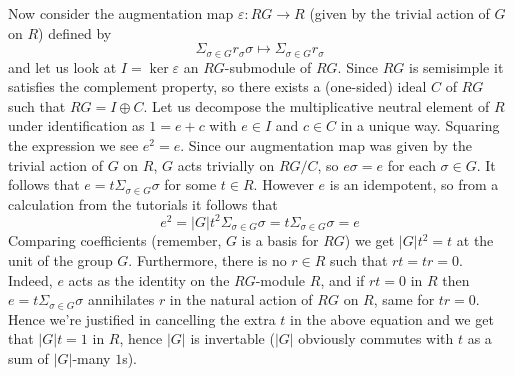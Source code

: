 \documentclass[a4paper, 12pt]{article}
\begin{document}
\begin{itemize}
	Now consider the augmentation map $\varepsilon \colon RG \to R$ (given by the trivial action of $G$ on $R$) defined by
	\[
	\Sigma_{\sigma \in G} r_\sigma \sigma \mapsto \Sigma_{\sigma \in G} r_\sigma
	\]
	and let us look at $I = \ker\varepsilon$ an $RG$-submodule of $RG$. Since $RG$ is semisimple it satisfies the complement property, so there exists a (one-sided) ideal $C$ of $RG$ such that $RG = I \oplus C$. Let us decompose the multiplicative neutral element of $R$ under identification as $1 = e + c$ with $e \in I$ and $c \in C$ in a unique way. Squaring the expression we see $e^2 = e$. Since our augmentation map was given by the trivial action of $G$ on $R$, $G$ acts trivially on $RG/C$, so $e\sigma = e$ for each $\sigma \in G$. It follows that $e = t\Sigma_{\sigma \in G}\sigma$ for some $t \in R$. However $e$ is an idempotent, so from a calculation from the tutorials it follows that
	\[
	e^2 = |G|t^2\Sigma_{\sigma \in G}\sigma = t\Sigma_{\sigma \in G}\sigma = e
	\]
	Comparing coefficients (remember, $G$ is a basis for $RG$) we get $|G|t^2 = t$ at the unit of the group $G$. Furthermore, there is no $r \in R$ such that $rt = tr = 0$. Indeed, $e$ acts as the identity on the $RG$-module $R$, and if $rt = 0$ in $R$ then $e = t \Sigma_{\sigma \in G}\sigma$ annihilates $r$ in the natural action of $RG$ on $R$, same for $tr = 0$. Hence we're justified in cancelling the extra $t$ in the above equation and we get that $|G|t = 1$ in $R$, hence $|G|$ is invertable ($|G|$ obviously commutes with $t$ as a sum of $|G|$-many $1$s).

\end{itemize}
\end{document}
